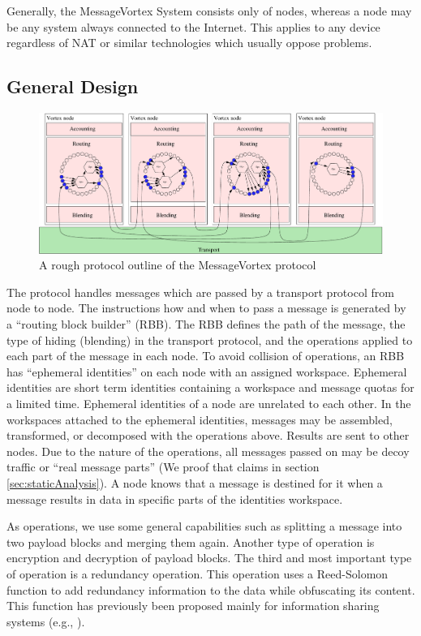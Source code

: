 \documentclass[10pt,journal,compsoc]{IEEEtran}
\let\MYoriglatexcaption\caption
\renewcommand{\caption}[2][\relax]{\MYoriglatexcaption[#2]{#2}}
\begin{document}
Generally, the MessageVortex System consists only of nodes, whereas a node may be any system always connected to the Internet. This applies to any device regardless of NAT or similar technologies which usually oppose problems.

\subsection{General Design}
\begin{figure}[ht!]
	\centering\includegraphics[width=\columnwidth]{../../inc/roughProtocolDesign.pdf}
	\caption{A rough protocol outline of the MessageVortex protocol}\label{fig:protocolOutline}
\end{figure}

The protocol handles messages which are passed by a transport protocol from node to node. The instructions how and when to pass a message is generated by a ``routing block builder'' (RBB). The RBB defines the path of the message, the type of hiding (blending) in the transport protocol, and the operations applied to each part of the message in each node. To avoid collision of operations, an RBB has ``ephemeral identities'' on each node with an assigned workspace. Ephemeral identities are short term identities containing a workspace and message quotas for a limited time. Ephemeral identities of a node are unrelated to each other. In the workspaces attached to the ephemeral identities, messages may be assembled, transformed, or decomposed with the operations above. Results are sent to other nodes. Due to the nature of the operations, all messages passed on may be decoy traffic or ``real message parts'' (We proof that claims in section \ref{sec:staticAnalysis}). A node knows that a message is destined for it when a message results in data in specific parts of the identities workspace.

As operations, we use some general capabilities such as splitting a message into two payload blocks and merging them again. Another type of operation is encryption and decryption of payload blocks. The third and most important type of operation is a redundancy operation. This operation uses a Reed-Solomon\cite{reed1960polynomial} function to add redundancy information to the data while obfuscating its content. This function has previously been proposed mainly for information sharing systems (e.g., \cite{mceliece1981sharing}).
\end{document}
